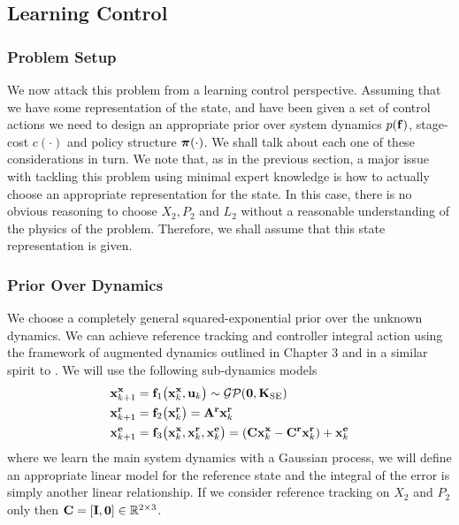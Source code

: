\subsection{Learning Control}
\subsubsection{Problem Setup}
We now attack this problem from a learning control perspective. Assuming that we have some representation of the state, and have been given a set of control actions we need to design an appropriate prior over system dynamics $p(\mathbf{f})$, stage-cost $c(\cdot)$ and policy structure $\boldsymbol{\pi}(\cdot)$. We shall talk about each one of these considerations in turn.
%
We note that, as in the previous section, a major issue with tackling this problem using minimal expert knowledge is how to actually choose an appropriate representation for the state. In this case, there is no obvious reasoning to choose $X_2, P_2$ and $L_2$ without a reasonable understanding of the physics of the problem. Therefore, we shall assume that this state representation is given.




\subsubsection{Prior Over Dynamics}
We choose a completely general squared-exponential prior over the unknown dynamics. We can achieve reference tracking and controller integral action using the framework of augmented dynamics outlined in Chapter 3 and in a similar spirit to . We will use the following sub-dynamics models
\begin{align*}
\mathbf{x}^{\mathbf{x}}_{k+1} &= \mathbf{f}_1\big(\mathbf{x}^{\mathbf{x}}_{k}, \mathbf{u}_k \big)
 \sim \mathcal{GP}(\mathbf{0},\mathbf{K}_{\text{SE}}) \\
\mathbf{x}^{\mathbf{r}}_{k+1} &= \mathbf{f}_2\big(\mathbf{x}^{\mathbf{r}}_{k} \big)
= \mathbf{A}^{\mathbf{r}} \mathbf{x}^{\mathbf{r}}_{k} \\
\mathbf{x}^{\mathbf{e}}_{k+1} &= \mathbf{f}_3\big(\mathbf{x}^{\mathbf{x}}_{k},\mathbf{x}^{\mathbf{r}}_{k},\mathbf{x}^{\mathbf{e}}_{k} \big) 
= (\mathbf{C}\mathbf{x}^{\mathbf{x}}_{k} - \mathbf{C}^{\mathbf{r}}\mathbf{x}^{\mathbf{r}}_{k}) + \mathbf{x}^{\mathbf{e}}_{k} 
\end{align*}
where we learn the main system dynamics with a Gaussian process, we will define an appropriate linear model for the reference state and the integral of the error is simply another linear relationship. If we consider reference tracking on $X_2$ and $P_2$ only then $\mathbf{C} = [\mathbf{I},\mathbf{0}] \in \mathbb{R}^{2\times 3}$.

